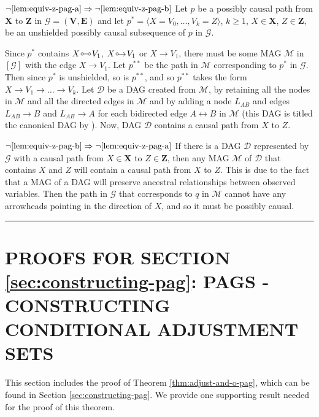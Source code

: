 \documentclass[twoside]{article}
\newcommand{\mb}[1]{\mathbf{#1}}
\newcommand{\g}[1][G]{\mathcal{#1}}
\newenvironment{proofof}[1][]{\begin{trivlist}
\item[\hskip \labelsep {\bfseries Proof of #1.}]}{\hfill\BlackBox\end{trivlist}}
\newcommand{\BlackBox}{\rule{1.5ex}{1.5ex}}
\newcommand{\circarrow}{
  \setlength{\unitlength}{1mm}
  \begin{picture}(5,1)(0,0)
    \put(1,1){\circle{1}}
    \put(1.2,0){$\rightarrow$}
  \end{picture}
}
\newcommand{\circcirc}{
  \setlength{\unitlength}{1mm}
  \begin{picture}(5,1)(0,0)
    \put(1,1){\circle{1}}
    \put(1.5,1){\line(1,0){2}}
    \put(4,1){\circle{1}}
  \end{picture}
}
\begin{document}
\begin{proofof}[Lemma \ref{lem:equiv-z-pag}]
    $\neg \ref{lem:equiv-z-pag-a} \Rightarrow \neg \ref{lem:equiv-z-pag-b}$ Let $p$ be a possibly causal path from $\mb{X}$ to $\mb{Z}$ in $\g=(\mb{V},\mb{E})$ and let $p^*=\langle X=V_0, \dots, V_k=Z \rangle$, $k \ge 1$, $X \in \mb{X}$, $Z \in \mb{Z}$, be an unshielded possibly causal subsequence of $p$ in $\g$. 

    Since $p^*$ contains $X \circcirc V_1$, $X \circarrow V_1$ or $X \to V_1$, there must be some MAG $\g[M]$ in $[\g]$ with the edge $X \to V_1$. Let $p^{**}$ be the path in $\g[M]$ corresponding to $p^*$ in $\g$. Then since $p^*$ is unshielded, so is $p^{**}$, and so $p^{**}$ takes the form $X \to V_1 \to \dots \to V_k$. Let $\g[D]$ be a DAG created from $\g[M]$, by retaining all the nodes in $\g[M]$ and all the directed edges in $\g[M]$ and by adding a node $L_{AB}$ and edges $L_{AB} \to B$ and $L_{AB} \to A$ for each bidirected edge $A \leftrightarrow B$ in $\g[M]$ (this DAG is titled the canonical DAG by \citealp{richardson2002ancestral}). Now, DAG $\g[D]$ contains a causal path from $X$ to $Z$.

    $\neg \ref{lem:equiv-z-pag-b} \Rightarrow \neg \ref{lem:equiv-z-pag-a}$ If there is a DAG $\g[D]$ represented by $\g$ with a causal path from $X \in \mb{X}$ to $Z \in \mb{Z}$, then any MAG $\g[M]$ of $\g[D]$ that contains $X$ and $Z$ will contain a causal path from $X$ to $Z$. This is due to the fact that a MAG of a DAG will preserve ancestral relationships  between observed variables. Then the path in $\g$ that corresponds to $q$ in $\g[M]$ cannot have any arrowheads pointing in the direction of $X$, and so it must be possibly causal.
\end{proofof}





\section{PROOFS FOR SECTION \ref{sec:constructing-pag}: PAGS - CONSTRUCTING CONDITIONAL ADJUSTMENT SETS}
\label{supp:constructing-pag}

This section includes the proof of Theorem \ref{thm:adjust-and-o-pag}, which can be found in Section \ref{sec:constructing-pag}. We provide one supporting result needed for the proof of this theorem.
\end{document}

